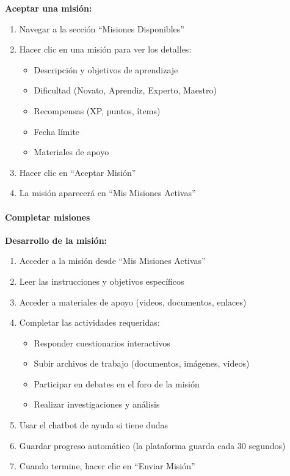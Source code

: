 \textbf{Aceptar una misión:}

\begin{enumerate}
	\item Navegar a la sección ``Misiones Disponibles''
	\item Hacer clic en una misión para ver los detalles:
	\begin{itemize}
		\item Descripción y objetivos de aprendizaje
		\item Dificultad (Novato, Aprendiz, Experto, Maestro)
		\item Recompensas (XP, puntos, ítems)
		\item Fecha límite
		\item Materiales de apoyo
	\end{itemize}
	\item Hacer clic en ``Aceptar Misión''
	\item La misión aparecerá en ``Mis Misiones Activas''
\end{enumerate}

\paragraph{Completar misiones}

\textbf{Desarrollo de la misión:}

\begin{enumerate}
	\item Acceder a la misión desde ``Mis Misiones Activas''
	\item Leer las instrucciones y objetivos específicos
	\item Acceder a materiales de apoyo (videos, documentos, enlaces)
	\item Completar las actividades requeridas:
	\begin{itemize}
		\item Responder cuestionarios interactivos
		\item Subir archivos de trabajo (documentos, imágenes, videos)
		\item Participar en debates en el foro de la misión
		\item Realizar investigaciones y análisis
	\end{itemize}
	\item Usar el chatbot de ayuda si tiene dudas
	\item Guardar progreso automático (la plataforma guarda cada 30 segundos)
	\item Cuando termine, hacer clic en ``Enviar Misión''
\end{enumerate}

